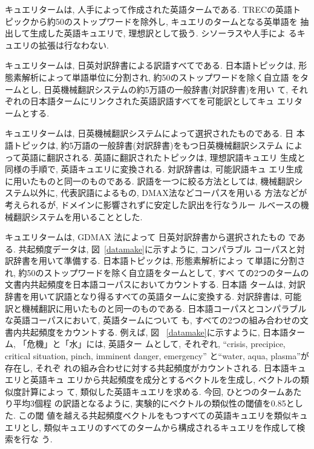 
キュエリタームは, 人手によって作成された英語タームである. TRECの英語ト
ピックから約50のストップワードを除外し, キュエリのタームとなる英単語を
抽出して生成した英語キュエリで, 理想訳として扱う. シソーラスや人手によ
るキュエリの拡張は行なわない. 


キュエリタームは, 日英対訳辞書による訳語すべてである. 日本語トピックは, 
形態素解析によって単語単位に分割され, 約50のストップワードを除く自立語
をタームとし, 日英機械翻訳システムの約5万語の一般辞書(対訳辞書)を用い
て, それぞれの日本語タームにリンクされた英語訳語すべてを可能訳としてキュ
エリタームとする. 


キュエリタームは, 日英機械翻訳システムによって選択されたものである. 日
本語トピックは, 約5万語の一般辞書(対訳辞書)をもつ日英機械翻訳システム
によって英語に翻訳される. 英語に翻訳されたトピックは, 理想訳語キュエリ
生成と同様の手順で, 英語キュエリに変換される. 対訳辞書は, 可能訳語キュ
エリ生成に用いたものと同一のものである. 訳語を一つに絞る方法としては, 
機械翻訳システム以外に, 代表訳語によるもの, DMAX法などコーパスを用いる
方法などが考えられるが, ドメインに影響されずに安定した訳出を行なうルー
ルベースの機械翻訳システムを用いることとした. 


キュエリタームは, GDMAX 法によって 日英対訳辞書から選択されたもの
である. 共起頻度データは, 図~\ref{datamake}に示すように, コンパラブル
コーパスと対訳辞書を用いて準備する. 日本語トピックは, 形態素解析によっ
て単語に分割され, 約50のストップワードを除く自立語をタームとして, すべ
ての2つのタームの文書内共起頻度を日本語コーパスにおいてカウントする. 日本語
タームは, 対訳辞書を用いて訳語となり得るすべての英語タームに変換する. 
対訳辞書は, 可能訳と機械翻訳に用いたものと同一のものである. 
日本語コーパスとコンパラブルな英語コーパスにおいて, 英語タームについて
も, すべての2つの組み合わせの文書内共起頻度をカウントする. 例えば, 図~
\ref{datamake}に示すように, 日本語ターム, 「危機」と「水」には, 英語ター
ムとして, それぞれ,  ``crisis, precipice, critical situation, pinch,
imminent danger, emergency'' と``water, aqua, plasma''が存在し, それぞ
れの組み合わせに対する共起頻度がカウントされる. 日本語キュエリと英語キュ
エリから共起頻度を成分とするベクトルを生成し, ベクトルの類似度計算によっ
て, 類似した英語キュエリを求める. 今回, ひとつのタームあたり平均3個程
の訳語となるように, 実験的にベクトルの類似性の閾値を0.85とした. この閾
値を越える共起頻度ベクトルをもつすべての英語キュエリを類似キュエリとし, 
類似キュエリのすべてのタームから構成されるキュエリを作成して検索を行な
う. 

